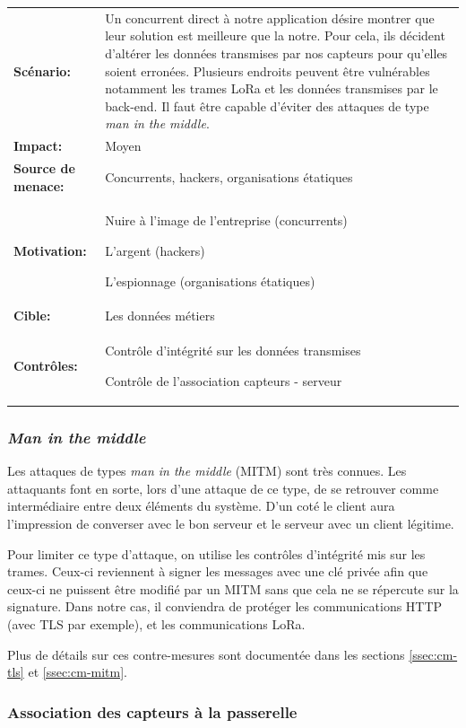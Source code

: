 \documentclass[12pt]{article}
\begin{document}
\renewcommand{\arraystretch}{1.6}
\begin{tabular}{@{}p{4cm}p{12cm}}
\textbf{Scénario:} &  Un concurrent direct à notre application désire montrer que leur solution est meilleure que la notre. Pour cela, ils décident d'altérer les données transmises par nos capteurs pour qu'elles soient erronées. Plusieurs endroits peuvent être vulnérables notamment les trames LoRa et les données transmises par le back-end. Il faut être capable d'éviter des attaques de type \emph{man in the middle}.  \\
\textbf{Impact:} & Moyen \\
\textbf{Source de menace: } & Concurrents, hackers, organisations étatiques \\
\textbf{Motivation:} & Nuire à l'image de l'entreprise (concurrents)

L'argent (hackers)

L'espionnage (organisations étatiques)\\
\textbf{Cible:} & Les données métiers\\
\textbf{Contrôles:} & Contrôle d'intégrité sur les données transmises

Contrôle de l'association capteurs - serveur
\end{tabular}
\renewcommand{\arraystretch}{1}

\subsubsection{\emph{Man in the middle}}

Les attaques de types \emph{man in the middle} (MITM) sont très connues. Les attaquants font en sorte, lors d'une attaque de ce type, de se retrouver comme intermédiaire entre deux éléments du système. D'un coté le client aura l'impression de converser avec le bon serveur et le serveur avec un client légitime.

Pour limiter ce type d'attaque, on utilise les contrôles d'intégrité mis sur les trames. Ceux-ci reviennent à signer les messages avec une clé privée afin que ceux-ci ne puissent être modifié par un MITM sans que cela ne se répercute sur la signature. Dans notre cas, il conviendra de protéger les communications HTTP (avec TLS par exemple), et les communications LoRa.

Plus de détails sur ces contre-mesures sont documentée dans les sections \ref{ssec:cm-tls} et \ref{ssec:cm-mitm}.

\subsubsection{Association des capteurs à la passerelle}
\end{document}
